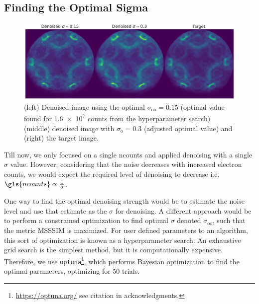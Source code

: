 \subsection{Finding the Optimal Sigma}
\begin{figure}
    \centering
    \includegraphics[width=1\linewidth]{images/denoised_optimal_sigma.pdf}
    \caption{(left) Denoised image using the optimal $\sigma_{\text{oo}}=0.15$ (optimal value found for \num{1.6e7} counts from the hyperparameter search) (middle) denoised image with $\sigma_{\text{o}}=0.3$ (adjusted optimal value) and (right) the target image.}
    \label{fig:denoised-optimal-sigma}
\end{figure}
Till now, we only focused on a single \gls{ncounts} and applied denoising with a single $\sigma$ value. However, considering that the noise decreases with increased electron counts, we would expect the required level of denoising to decrease i.e. $\gls{ncounts}\propto\frac{1}{\sigma}$.

One way to find the optimal denoising strength would be to estimate the noise level and use that estimate as the $\sigma$ for denoising. A different approach would be to perform a constrained  optimization to find optimal $\sigma$ denoted $\sigma_{\text{oo}}$, such that the metric \gls{MSSSIM} is maximized. For user defined parameters to an algorithm, this sort of optimization is known as a hyperparameter search. An exhaustive grid search is the simplest method, but it is computationally expensive. Therefore, we use \texttt{optuna}\footnote{\href{https://optuna.org/}{https://optuna.org/} see citation in acknowledgments.}, which performs Bayesian optimization to find the optimal parameters, optimizing for \num{50} trials.

